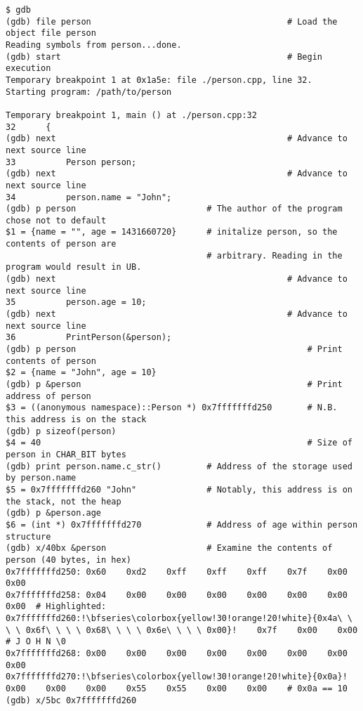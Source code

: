 \documentclass[11pt, letterpaper]{article} %
\begin{document}
\begin{lstlisting}[style=labreportstyle-sh,escapechar=!]
$ gdb
(gdb) file person                                       # Load the object file person
Reading symbols from person...done.
(gdb) start                                             # Begin execution
Temporary breakpoint 1 at 0x1a5e: file ./person.cpp, line 32.
Starting program: /path/to/person 

Temporary breakpoint 1, main () at ./person.cpp:32
32      {
(gdb) next                                              # Advance to next source line
33          Person person;
(gdb) next                                              # Advance to next source line
34          person.name = "John";
(gdb) p person                          # The author of the program chose not to default
$1 = {name = "", age = 1431660720}      # initalize person, so the contents of person are
                                        # arbitrary. Reading in the program would result in UB.
(gdb) next                                              # Advance to next source line
35          person.age = 10;
(gdb) next                                              # Advance to next source line
36          PrintPerson(&person);
(gdb) p person                                              # Print contents of person
$2 = {name = "John", age = 10}
(gdb) p &person                                             # Print address of person
$3 = ((anonymous namespace)::Person *) 0x7fffffffd250       # N.B. this address is on the stack
(gdb) p sizeof(person)
$4 = 40                                                     # Size of person in CHAR_BIT bytes
(gdb) print person.name.c_str()         # Address of the storage used by person.name
$5 = 0x7fffffffd260 "John"              # Notably, this address is on the stack, not the heap
(gdb) p &person.age
$6 = (int *) 0x7fffffffd270             # Address of age within person structure
(gdb) x/40bx &person                    # Examine the contents of person (40 bytes, in hex)
0x7fffffffd250: 0x60    0xd2    0xff    0xff    0xff    0x7f    0x00    0x00
0x7fffffffd258: 0x04    0x00    0x00    0x00    0x00    0x00    0x00    0x00  # Highlighted:
0x7fffffffd260:!\bfseries\colorbox{yellow!30!orange!20!white}{0x4a\ \ \ \ 0x6f\ \ \ \ 0x68\ \ \ \ 0x6e\ \ \ \ 0x00}!    0x7f    0x00    0x00    # J O H N \0
0x7fffffffd268: 0x00    0x00    0x00    0x00    0x00    0x00    0x00    0x00
0x7fffffffd270:!\bfseries\colorbox{yellow!30!orange!20!white}{0x0a}!    0x00    0x00    0x00    0x55    0x55    0x00    0x00    # 0x0a == 10
(gdb) x/5bc 0x7fffffffd260

\end{lstlisting}
\end{document}
